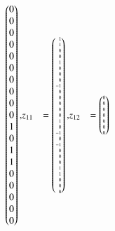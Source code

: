 \begin{beispiel}
{\begin{align*}
\begin{pmatrix*}[r]
 0\\
 0\\ %
 0\\ 
 0\\
 0\\
 0\\
 0\\ %
 0\\
 0\\
 0\\
 1\\
 0\\ %
 1\\
 1\\
 0\\
 0\\
 0\\ %
 0\\
 0
\end{pmatrix*},
&z_{11} %
&=
\tiny
\begin{pmatrix*}[r]
 1\\
 1\\
 0\\
 0\\
 1\\ %
 0\\
 0\\
 0\\
-1\\
 0\\ %
 0\\
 0\\
 0\\
 0\\
 1\\ %
 0\\
-1\\
 0\\
-1\\
 0\\ %
 0\\
 0\\
 1\\
 1\\
 0\\ %
 0\\
 0
\end{pmatrix*},
&z_{12} %
&=
\tiny
\begin{pmatrix*}[r]
 0\\
 0\\
 0\\
 0\\
 0\\
 0\\
 0\\

\end{pmatrix*}
\end{align*}}
\end{beispiel}
